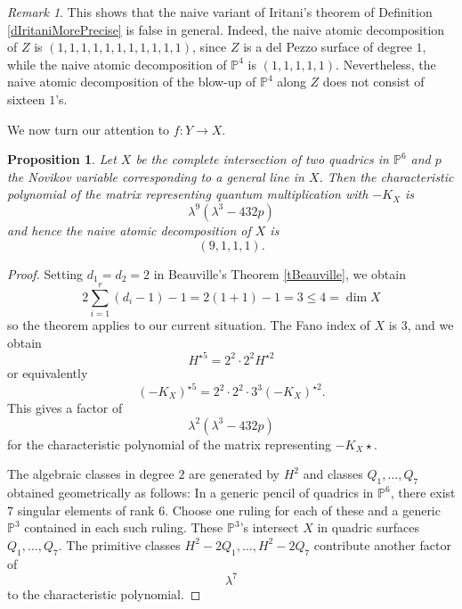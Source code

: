 \documentclass[11pt]{amsart}
\theoremstyle{plain}
\newtheorem{proposition}[theorem]{Proposition}
\numberwithin{equation}{section}
\theoremstyle{definition}
\theoremstyle{remark}
\newtheorem{remark}[theorem]{Remark}
\renewcommand{\P}{\mathbb P}
\begin{document}
\begin{remark}
This shows that the naive variant of Iritani's theorem of Definition \ref{dIritaniMorePrecise} is false in general. Indeed, the naive atomic decomposition of $Z$ is $(1,1,1,1,1,1,1,1,1,1,1)$, since $Z$ is a del Pezzo surface of degree $1$, while the naive atomic decomposition of $\P^4$ is $(1,1,1,1,1)$. Nevertheless, the naive atomic decomposition of the blow-up of $\P^4$ along $Z$ does not consist of sixteen $1$’s. %
\end{remark}

We now turn our attention to $f : Y \to X$.

\begin{proposition}
    Let $X$ be the complete intersection of two quadrics in $\mathbb{P}^6$ and $p$ the Novikov variable corresponding to a general line in $X$. Then the characteristic polynomial of the matrix representing quantum multiplication with $-K_X$ is
    $$
        \lambda^9(\lambda^3-432p)
    $$
    and hence the naive atomic decomposition of $X$ is
    $$
        (9,1,1,1).
    $$
\end{proposition}

\begin{proof}
    Setting $d_1=d_2=2$ in Beauville's Theorem \ref{tBeauville}, we obtain 
    $$
        2\sum_{i=1}^r (d_i - 1) - 1 = 2(1 + 1) - 1 = 3 \le 4 = \dim X
    $$
    so the theorem applies to our current situation. The Fano index of $X$ is $3$, and we obtain
    $$
        H^{\star 5} = 2^2 \cdot 2^2 H^{\star 2} 
    $$
    or equivalently
    $$
        (-K_X)^{\star 5} = 2^2 \cdot 2^2 \cdot 3^3 (-K_X)^{\star 2}.
    $$
    This gives a factor of
    $$
         \lambda^2(\lambda^3-432 p)
    $$
    for the characteristic polynomial of the matrix representing $-K_X \star$.
    
    The algebraic classes in degree $2$ are generated by $H^2$ and classes $Q_1,\dots,Q_7$ obtained geometrically as follows: In a generic pencil of quadrics in $\mathbb{P}^6$, there exist $7$ singular elements of rank $6$. Choose one ruling for each of these and a generic $\mathbb{P}^3$ contained in each such ruling. These $\mathbb{P}^3$'s intersect $X$ in quadric surfaces $Q_1,\dots,Q_7$. 
    The primitive classes $H^2-2Q_1, \dots, H^2-2Q_7$ contribute another factor of
    $$
        \lambda^7
    $$
    to the characteristic polynomial. 
\end{proof}
\end{document}
